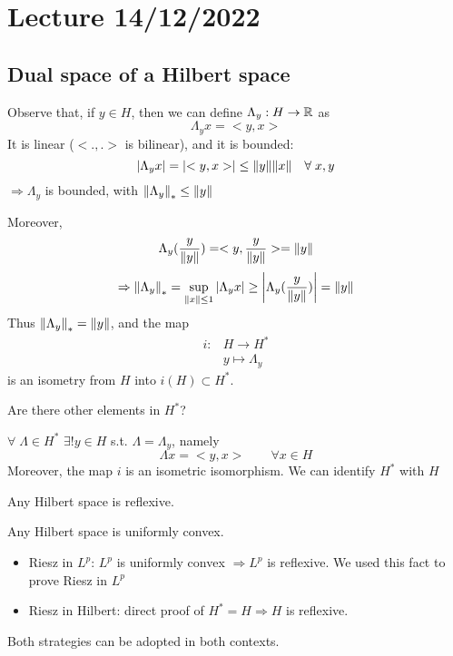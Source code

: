 \section{Lecture 14/12/2022}

\subsection*{Dual space of a Hilbert space}
Observe that, if \(y \in H\), then we can define \(\Lambda_y : H \to \mathbb{R}\) as
\[
    \Lambda_y x = <y, x>
\]
It is linear (\(<.,.> \) is bilinear), and it is bounded: 
\[
    \abs{\Lambda_y x}= \abs{<y, x>} \leq \norm{y} \norm{x} \quad \forall\; x, y
\]
\(\Rightarrow \Lambda_y\) is bounded, with \(\norm{\Lambda_y}_* \leq \norm{y}\)

Moreover, 
\[
    \Lambda_y (\frac{y}{\norm{y}}) = <y, \frac{y}{\norm{y}}> = \norm{y}
\]
\[
    \Rightarrow \norm{\Lambda_y}_* = \sup_{\norm{x} \leq 1} \abs{\Lambda_y x} \geq \abs{\Lambda_y (\frac{y}{\norm{y}})} = \norm{y}
\]
Thus \( \norm{\Lambda_y}_* = \norm{y}\), and the map 
\[
    \begin{array}{rl}
        i: & H \to H^* \\
        & y \mapsto \Lambda_y    
    \end{array}
\]
is an isometry from \(H\) into \(i(H) \subset {H^*}\).

Are there other elements in \(H^*\)?

\begin{theorem}
    \(\forall \; \Lambda \in H^* \) \(\exists! y \in H\) s.t. \(\Lambda = \Lambda_y\), namely
    \[
        \Lambda x = <y, x> \qquad \forall x \in H
    \]
    Moreover, the map \(i\) is an isometric isomorphism. We can identify \(H^*\) with \(H\)
\end{theorem}

\begin{corollary}
    Any Hilbert space is reflexive. 
\end{corollary}
\begin{remark}
    Any Hilbert space is uniformly convex.
\end{remark}

\begin{itemize}
    \item Riesz in \(L^p\): \(L^p \) is uniformly convex \(\Rightarrow L^p\) is reflexive. We used this fact to prove Riesz in \(L^p\)
    \item Riesz in Hilbert: direct proof of \(H^* = H \Rightarrow H\) is reflexive.
\end{itemize}
Both strategies can be adopted in both contexts.

